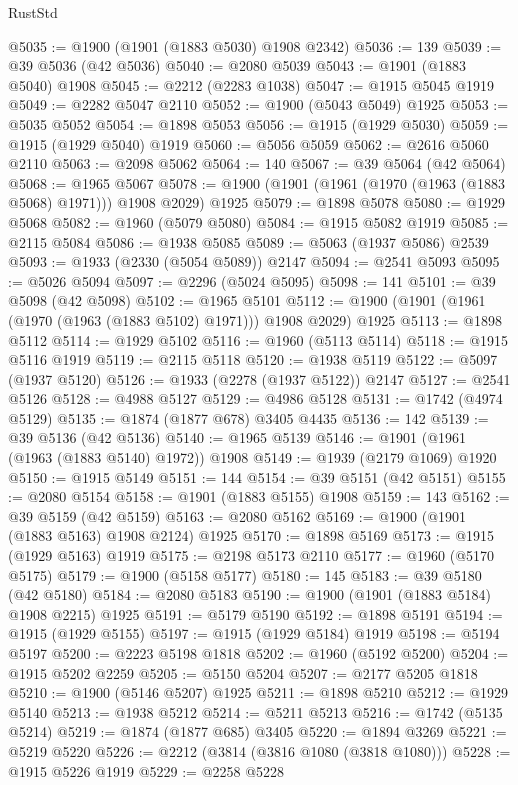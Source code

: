 \begin{lexlean}{RustStd}
\begin{coremodule}
@5035 := @1900 (@1901 (@1883 @5030) @1908 @2342)
@5036 := 139
@5039 := @39 @5036 (@42 @5036)
@5040 := @2080 @5039
@5043 := @1901 (@1883 @5040) @1908
@5045 := @2212 (@2283 @1038)
@5047 := @1915 @5045 @1919
@5049 := @2282 @5047 @2110
@5052 := @1900 (@5043 @5049) @1925
@5053 := @5035 @5052
@5054 := @1898 @5053
@5056 := @1915 (@1929 @5030)
@5059 := @1915 (@1929 @5040) @1919
@5060 := @5056 @5059
@5062 := @2616 @5060 @2110
@5063 := @2098 @5062
@5064 := 140
@5067 := @39 @5064 (@42 @5064)
@5068 := @1965 @5067
@5078 := @1900 (@1901 (@1961 (@1970 (@1963 (@1883 @5068) @1971))) @1908 @2029) @1925
@5079 := @1898 @5078
@5080 := @1929 @5068
@5082 := @1960 (@5079 @5080)
@5084 := @1915 @5082 @1919
@5085 := @2115 @5084
@5086 := @1938 @5085
@5089 := @5063 (@1937 @5086) @2539
@5093 := @1933 (@2330 (@5054 @5089)) @2147
@5094 := @2541 @5093
@5095 := @5026 @5094
@5097 := @2296 (@5024 @5095)
@5098 := 141
@5101 := @39 @5098 (@42 @5098)
@5102 := @1965 @5101
@5112 := @1900 (@1901 (@1961 (@1970 (@1963 (@1883 @5102) @1971))) @1908 @2029) @1925
@5113 := @1898 @5112
@5114 := @1929 @5102
@5116 := @1960 (@5113 @5114)
@5118 := @1915 @5116 @1919
@5119 := @2115 @5118
@5120 := @1938 @5119
@5122 := @5097 (@1937 @5120)
@5126 := @1933 (@2278 (@1937 @5122)) @2147
@5127 := @2541 @5126
@5128 := @4988 @5127
@5129 := @4986 @5128
@5131 := @1742 (@4974 @5129)
@5135 := @1874 (@1877 @678) @3405 @4435
@5136 := 142
@5139 := @39 @5136 (@42 @5136)
@5140 := @1965 @5139
@5146 := @1901 (@1961 (@1963 (@1883 @5140) @1972)) @1908
@5149 := @1939 (@2179 @1069) @1920
@5150 := @1915 @5149
@5151 := 144
@5154 := @39 @5151 (@42 @5151)
@5155 := @2080 @5154
@5158 := @1901 (@1883 @5155) @1908
@5159 := 143
@5162 := @39 @5159 (@42 @5159)
@5163 := @2080 @5162
@5169 := @1900 (@1901 (@1883 @5163) @1908 @2124) @1925
@5170 := @1898 @5169
@5173 := @1915 (@1929 @5163) @1919
@5175 := @2198 @5173 @2110
@5177 := @1960 (@5170 @5175)
@5179 := @1900 (@5158 @5177)
@5180 := 145
@5183 := @39 @5180 (@42 @5180)
@5184 := @2080 @5183
@5190 := @1900 (@1901 (@1883 @5184) @1908 @2215) @1925
@5191 := @5179 @5190
@5192 := @1898 @5191
@5194 := @1915 (@1929 @5155)
@5197 := @1915 (@1929 @5184) @1919
@5198 := @5194 @5197
@5200 := @2223 @5198 @1818
@5202 := @1960 (@5192 @5200)
@5204 := @1915 @5202 @2259
@5205 := @5150 @5204
@5207 := @2177 @5205 @1818
@5210 := @1900 (@5146 @5207) @1925
@5211 := @1898 @5210
@5212 := @1929 @5140
@5213 := @1938 @5212
@5214 := @5211 @5213
@5216 := @1742 (@5135 @5214)
@5219 := @1874 (@1877 @685) @3405
@5220 := @1894 @3269
@5221 := @5219 @5220
@5226 := @2212 (@3814 (@3816 @1080 (@3818 @1080)))
@5228 := @1915 @5226 @1919
@5229 := @2258 @5228

\end{coremodule}
\end{lexlean}
